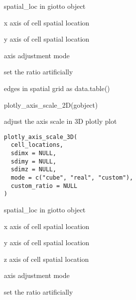 \documentclass[a4paper]{book}
\begin{document}
%
\begin{Arguments}
\begin{ldescription}
\item[\code{cell\_locations}] spatial\_loc in giotto object

\item[\code{sdimx}] x axis of cell spatial location

\item[\code{sdimy}] y axis of cell spatial location

\item[\code{mode}] axis adjustment mode

\item[\code{custom\_ratio}] set the ratio artificially
\end{ldescription}
\end{Arguments}
%
\begin{Value}
edges in spatial grid as data.table()
\end{Value}
%
\begin{Examples}
\begin{ExampleCode}
    plotly_axis_scale_2D(gobject)
\end{ExampleCode}
\end{Examples}
%
\begin{Description}\relax
adjust the axis scale in 3D plotly plot
\end{Description}
%
\begin{Usage}
\begin{verbatim}
plotly_axis_scale_3D(
  cell_locations,
  sdimx = NULL,
  sdimy = NULL,
  sdimz = NULL,
  mode = c("cube", "real", "custom"),
  custom_ratio = NULL
)
\end{verbatim}
\end{Usage}
%
\begin{Arguments}
\begin{ldescription}
\item[\code{cell\_locations}] spatial\_loc in giotto object

\item[\code{sdimx}] x axis of cell spatial location

\item[\code{sdimy}] y axis of cell spatial location

\item[\code{sdimz}] z axis of cell spatial location

\item[\code{mode}] axis adjustment mode

\item[\code{custom\_ratio}] set the ratio artificially
\end{ldescription}
\end{Arguments}
\end{document}
